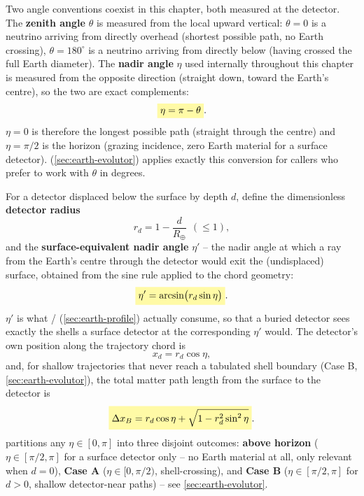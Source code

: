 \begin{notebox}[title={Nadir Angle and Its Relation to the Zenith Angle}]
Two angle conventions coexist in this chapter, both measured at the
detector. The \textbf{zenith angle} $\theta$ is measured from the local
upward vertical: $\theta=0$ is a neutrino arriving from directly overhead
(shortest possible path, no Earth crossing), $\theta=180^\circ$ is a
neutrino arriving from directly below (having crossed the full Earth
diameter). The \textbf{nadir angle} $\eta$ used internally throughout this
chapter is measured from the opposite direction (straight down, toward the
Earth's centre), so the two are exact complements:
\begin{equation}
  \keyresult{\eta = \pi - \theta}.
\end{equation}
$\eta=0$ is therefore the longest possible path (straight through the
centre) and $\eta=\pi/2$ is the horizon (grazing incidence, zero Earth
material for a surface detector). 
(\cref{sec:earth-evolutor}) applies exactly this conversion for callers
who prefer to work with $\theta$ in degrees.
\end{notebox}

\begin{theorybox}
For a detector displaced below the surface by depth $d$, define the
dimensionless \textbf{detector radius}
\begin{equation}
  r_d = 1 - \frac{d}{R_\oplus}\ \ (\le 1),
\end{equation}
and the \textbf{surface-equivalent nadir angle} $\eta'$ -- the nadir angle
at which a ray from the Earth's centre through the detector would exit the
(undisplaced) surface, obtained from the sine rule applied to the chord
geometry:
\begin{equation}
  \keyresult{\eta' = \arcsin\bigl(r_d\sin\eta\bigr)}.
\end{equation}
$\eta'$ is what /
(\cref{sec:earth-profile}) actually consume, so that a buried detector sees
exactly the shells a surface detector at the corresponding $\eta'$ would.
The detector's own position along the trajectory chord is
\begin{equation}
  x_d = r_d\cos\eta,
\end{equation}
and, for shallow trajectories that never reach a tabulated shell boundary
(Case B, \cref{sec:earth-evolutor}), the total matter path length from the
surface to the detector is
\begin{equation}
  \keyresult{\Delta x_B = r_d\cos\eta + \sqrt{1-r_d^2\sin^2\eta}}.
\end{equation}
 partitions any $\eta\in[0,\pi]$ into three
disjoint outcomes: \textbf{above horizon} ($\eta\in[\pi/2,\pi]$ for a
surface detector only -- no Earth material at all, only relevant when
$d=0$), \textbf{Case A} ($\eta\in[0,\pi/2)$, shell-crossing), and
\textbf{Case B} ($\eta\in[\pi/2,\pi]$ for $d>0$, shallow detector-near
paths) -- see \cref{sec:earth-evolutor}.
\end{theorybox}

